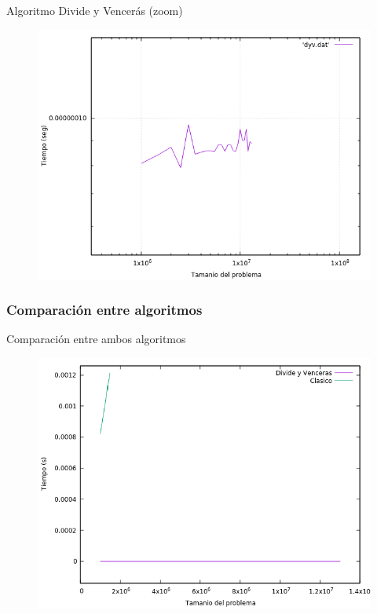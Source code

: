 \documentclass{beamer}
\begin{document}
\begin{frame}[fragile]{Algoritmo Divide y Vencerás (zoom)}
\begin{figure}[H]
\centering
\includegraphics[scale=0.5]{dyv_zoom.png}
\end{figure}
\end{frame}


\subsubsection{Comparación entre algoritmos}
\begin{frame}[fragile]{Comparación entre ambos algoritmos}
\begin{figure}[H]
\centering
\includegraphics[scale=0.5]{empirica_ambos.png}
\end{figure}
\end{frame}
\end{document}
